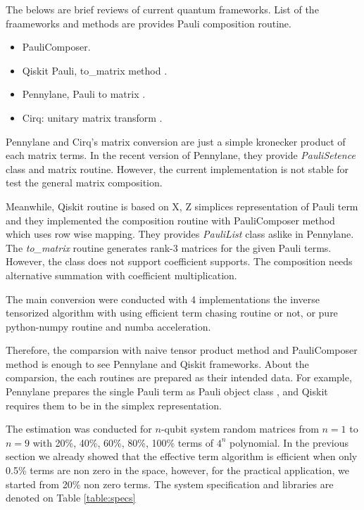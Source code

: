 \documentclass[twocolumn]{article}
\begin{document}
The belows are brief reviews of current quantum frameworks.
List of the fraameworks and methods are provides Pauli composition routine.

\begin{itemize}
    \item PauliComposer\cite{vidal_romero_paulicomposer_2023}.
    \item Qiskit Pauli, to\_matrix method \cite{Qiskit}.
    \item Pennylane, Pauli to matrix \cite{bergholm2018pennylane}. %
    \item Cirq: unitary matrix transform \cite{cirq_developers_2023_10247207}. %
\end{itemize}

Pennylane and Cirq's matrix conversion are just a simple kronecker product of each matrix terms.
In the recent version of Pennylane, they provide \textit{PauliSetence} class and matrix routine.
However, the current implementation is not stable for test the general matrix composition.%

Meanwhile, Qiskit routine is based on X, Z simplices representation of Pauli term 
and they implemented the composition routine with PauliComposer method 
which uses row wise mapping.
They provides \textit{PauliList} class aslike in Pennylane. 
The \textit{to\_matrix} routine generates rank-3 matrices for the given Pauli terms.
However, the class does not support coefficient supports. 
The composition needs alternative summation with coefficient multiplication.

The main conversion were conducted with 4 implementations the inverse tensorized algorithm
with using efficient term chasing routine or not, or pure python-numpy routine and numba acceleration.

Therefore, the comparsion with naive tensor product method and PauliComposer method
is enough to see Pennylane and Qiskit frameworks. 
About the comparsion, the each routines are prepared as their intended 
data. For example, Pennylane prepares the single Pauli term as Pauli object class
, and Qiskit requires them to be in the simplex representation.

The estimation was conducted for $n$-qubit system random matrices from $n=1$ to $n=9$
with 20\%, 40\%, 60\%, 80\%, 100\% terms of $4^n$ polynomial.
In the previous section we already showed that the effective term algorithm is 
efficient when only 0.5\% terms are non zero in the space, however,
for the practical application, we started from 20\% non zero terms. 
The system specification and libraries are denoted on Table \ref{table:specs}
\end{document}
